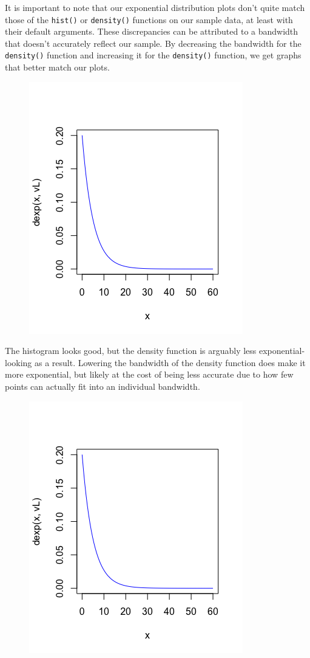 \documentclass[12pt, a4paper, oneside]{report}
\begin{document}
It is important to note that our exponential distribution plots don't quite match those of the \lstinline{hist()} or \lstinline{density()} functions on our sample data, at least with their default arguments. These discrepancies can be attributed to a bandwidth that doesn't accurately reflect our sample. 
By decreasing the bandwidth for the \lstinline{density()} function and increasing it for the \lstinline{density()} function, we get graphs that better match our plots.

\begin{figure}[h]
  \centering
  \includegraphics[scale=0.5]{images/vL.png} %
  \caption{}
\end{figure}

The histogram looks good, but the density function is arguably less exponential-looking as a result. Lowering the bandwidth of the density function does make it more exponential, but likely at the cost of being less accurate due to how few points can actually fit into an individual bandwidth. 

\begin{figure}[h]
  \centering
  \includegraphics[scale=0.5]{images/vL.png} %
  \caption{}
\end{figure}
\end{document}
